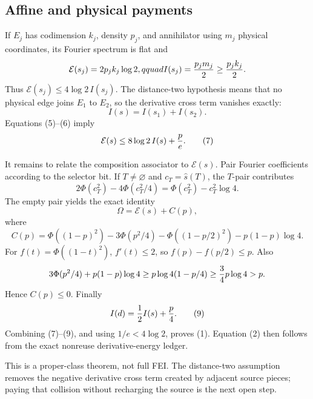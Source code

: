 \subsection*{Affine and physical payments}
If $E_j$ has codimension $k_j$, density $p_j$, and annihilator using $m_j$
physical coordinates, its Fourier spectrum is flat and
\[
 \mathcal E(s_j)=2p_jk_j\log2,qquad
 I(s_j)={p_jm_j\over2}\geq{p_jk_j\over2}.
\]
Thus $\mathcal E(s_j)\leq4\log2\,I(s_j)$.  The distance-two hypothesis
means that no physical edge joins $E_1$ to $E_2$, so the derivative cross
term vanishes exactly:
\[
 I(s)=I(s_1)+I(s_2).                                        \tag{6}
\]
Equations (5)--(6) imply
\[
 \mathcal E(s)\leq8\log2\,I(s)+{p\over e}.                 \tag{7}
\]

It remains to relate the composition associator to $\mathcal E(s)$.  Pair
Fourier coefficients according to the selector bit.  If $T\ne\varnothing$
and $c_T=\widehat s(T)$, the $T$-pair contributes
\[
 2\Phi(c_T^2)-4\Phi(c_T^2/4)
 =\Phi(c_T^2)-c_T^2\log4.
\]
The empty pair yields the exact identity
\[
 \Omega=\mathcal E(s)+C(p),                                 \tag{8}
\]
where
\[
 C(p)=\Phi((1-p)^2)-3\Phi(p^2/4)-\Phi((1-p/2)^2)
       -p(1-p)\log4.
\]
For $f(t)=\Phi((1-t)^2)$, $f'(t)\leq2$, so
$f(p)-f(p/2)\leq p$.  Also
\[
 3\Phi(p^2/4)+p(1-p)\log4
 \geq p\log4(1-p/4)\geq {3\over4}p\log4>p.
\]
Hence $C(p)\leq0$.  Finally
\[
 I(d)={1\over2}I(s)+{p\over4}.                              \tag{9}
\]
Combining (7)--(9), and using $1/e<4\log2$, proves (1).  Equation (2)
then follows from the exact nonreuse derivative-energy ledger.

This is a proper-class theorem, not full FEI.  The distance-two assumption
removes the negative derivative cross term created by adjacent source pieces;
paying that collision without recharging the source is the next open step.

